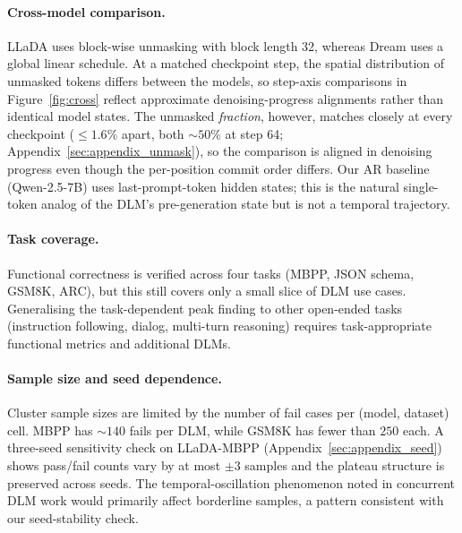 \documentclass[11pt]{article}
\begin{document}
\paragraph{Cross-model comparison.}
LLaDA uses block-wise unmasking with block length 32, whereas Dream uses a global linear schedule.
At a matched checkpoint step, the spatial distribution of unmasked tokens differs between the models, so step-axis comparisons in Figure~\ref{fig:cross} reflect approximate denoising-progress alignments rather than identical model states.
The unmasked \emph{fraction}, however, matches closely at every checkpoint ($\le\!1.6\%$ apart, both $\sim$$50\%$ at step 64; Appendix~\ref{sec:appendix_unmask}), so the comparison is aligned in denoising progress even though the per-position commit order differs.
Our AR baseline (Qwen-2.5-7B) uses last-prompt-token hidden states; this is the natural single-token analog of the DLM's pre-generation state but is not a temporal trajectory.

\paragraph{Task coverage.}
Functional correctness is verified across four tasks (MBPP, JSON schema, GSM8K, ARC), but this still covers only a small slice of DLM use cases.
Generalising the task-dependent peak finding to other open-ended tasks (instruction following, dialog, multi-turn reasoning) requires task-appropriate functional metrics and additional DLMs.

\paragraph{Sample size and seed dependence.}
Cluster sample sizes are limited by the number of fail cases per (model, dataset) cell. MBPP has $\sim$$140$ fails per DLM, while GSM8K has fewer than $250$ each.
A three-seed sensitivity check on LLaDA-MBPP (Appendix~\ref{sec:appendix_seed}) shows pass/fail counts vary by at most $\pm 3$ samples and the plateau structure is preserved across seeds. The temporal-oscillation phenomenon noted in concurrent DLM work \citep{wang2025time} would primarily affect borderline samples, a pattern consistent with our seed-stability check.
\end{document}
